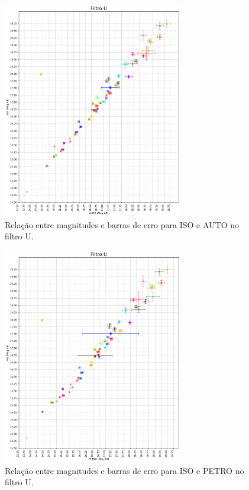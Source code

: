 \begin{figure}
  \centering 
  \includegraphics[width=0.7\textwidth]{Imagens/iso_auto.png} 
  \caption[Relação entre magnitudes e barras de erro para ISO e AUTO no filtro U.]{Relação entre magnitudes e barras de erro para ISO e AUTO no filtro U.}
  \label{fig:iso_auto} 
\end{figure}

\begin{figure}
  \centering 
  \includegraphics[width=0.7\textwidth]{Imagens/iso_petro.png} 
  \caption[Relação entre magnitudes e barras de erro para ISO e PETRO no filtro U.]{Relação entre magnitudes e barras de erro para ISO e PETRO no filtro U.}
  \label{fig:iso_petro}
\end{figure}

